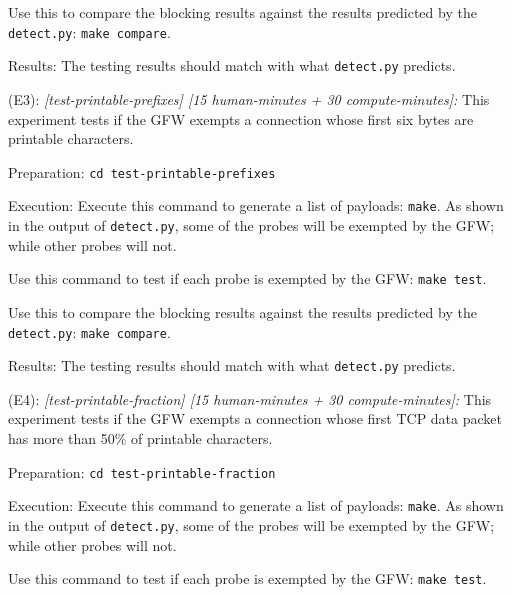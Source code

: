 \begin{compactdesc}
\begin{asparadesc}
        Use this to compare the blocking results against the results predicted by the \texttt{detect.py}:
        \texttt{make compare}.

        \item[Results:] The testing results should match with what \texttt{detect.py} predicts.
    \end{asparadesc}


    \item[(E3):] \textit{[test-printable-prefixes] [15 human-minutes + 30 compute-minutes]:}
    This experiment tests if the GFW exempts a connection whose
    first six bytes are printable characters.
    \begin{asparadesc}
        \item[Preparation:] \texttt{cd test-printable-prefixes}

        \item[Execution:]
        Execute this command to generate a list of payloads: \texttt{make}. 
        As shown in the output of \texttt{detect.py},
        some of the probes will be exempted by the GFW; 
        while other probes will not.

        Use this command to test if each probe is exempted by the GFW:
        \texttt{make test}.

        Use this to compare the blocking results against the results predicted by the \texttt{detect.py}:
        \texttt{make compare}.

        \item[Results:] The testing results should match with what \texttt{detect.py} predicts.
    \end{asparadesc}
    
    \item[(E4):] \textit{[test-printable-fraction] [15 human-minutes + 30 compute-minutes]:}
    This experiment tests if the GFW exempts a connection whose
    first TCP data packet has more than 50\% of printable characters.
    \begin{asparadesc}
        \item[Preparation:] \texttt{cd test-printable-fraction}

        \item[Execution:]
        Execute this command to generate a list of payloads: \texttt{make}. 
        As shown in the output of \texttt{detect.py},
        some of the probes will be exempted by the GFW; 
        while other probes will not.

        Use this command to test if each probe is exempted by the GFW:
        \texttt{make test}.


\end{asparadesc}
\end{compactdesc}
